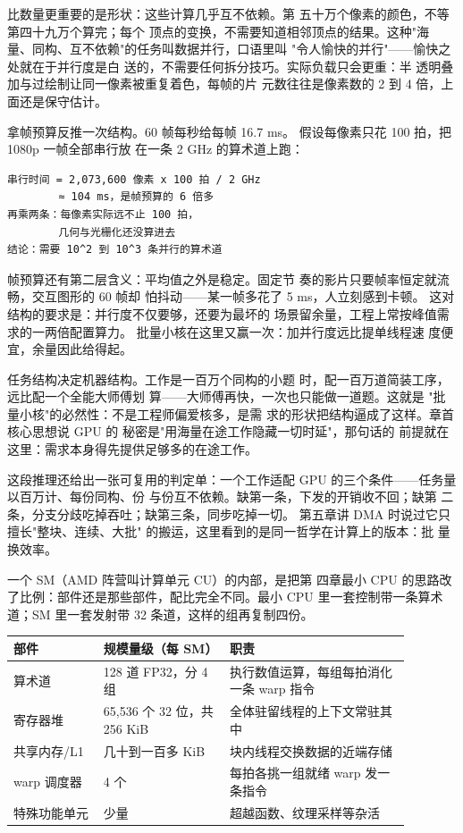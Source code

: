 比数量更重要的是形状：这些计算几乎互不依赖。第
五十万个像素的颜色，不等第四十九万个算完；每个
顶点的变换，不需要知道相邻顶点的结果。这种"海
量、同构、互不依赖"的任务叫数据并行，口语里叫
"令人愉快的并行"——愉快之处就在于并行度是白
送的，不需要任何拆分技巧。实际负载只会更重：半
透明叠加与过绘制让同一像素被重复着色，每帧的片
元数往往是像素数的 2 到 4 倍，上面还是保守估计。

拿帧预算反推一次结构。60 帧每秒给每帧 16.7 ms。
假设每像素只花 100 拍，把 1080p 一帧全部串行放
在一条 2 GHz 的算术道上跑：

\begin{lstlisting}
串行时间 = 2,073,600 像素 x 100 拍 / 2 GHz
        ≈ 104 ms，是帧预算的 6 倍多
再乘两条：每像素实际远不止 100 拍，
        几何与光栅化还没算进去
结论：需要 10^2 到 10^3 条并行的算术道
\end{lstlisting}

帧预算还有第二层含义：平均值之外是稳定。固定节
奏的影片只要帧率恒定就流畅，交互图形的 60 帧却
怕抖动——某一帧多花了 5 ms，人立刻感到卡顿。
这对结构的要求是：并行度不仅要够，还要为最坏的
场景留余量，工程上常按峰值需求的一两倍配置算力。
批量小核在这里又赢一次：加并行度远比提单线程速
度便宜，余量因此给得起。

任务结构决定机器结构。工作是一百万个同构的小题
时，配一百万道简装工序，远比配一个全能大师傅划
算——大师傅再快，一次也只能做一道题。这就是
"批量小核"的必然性：不是工程师偏爱核多，是需
求的形状把结构逼成了这样。章首核心思想说 GPU 的
秘密是"用海量在途工作隐藏一切时延"，那句话的
前提就在这里：需求本身得先提供足够多的在途工作。

这段推理还给出一张可复用的判定单：一个工作适配
GPU 的三个条件——任务量以百万计、每份同构、份
与份互不依赖。缺第一条，下发的开销收不回；缺第
二条，分支分歧吃掉吞吐；缺第三条，同步吃掉一切。
第五章讲 DMA 时说过它只擅长"整块、连续、大批"
的搬运，这里看到的是同一哲学在计算上的版本：批
量换效率。

一个 SM（AMD 阵营叫计算单元 CU）的内部，是把第
四章最小 CPU 的思路改
了比例：部件还是那些部件，配比完全不同。最小
CPU 里一套控制带一条算术道；SM 里一套发射带 32
条道，这样的组再复制四份。

\begin{longtable}{L{0.2\linewidth}L{0.28\linewidth}L{0.4\linewidth}}
\toprule
部件 & 规模量级（每 SM） & 职责 \\
\midrule
算术道 & 128 道 FP32，分 4 组 & 执行数值运算，每组每拍消化一条 warp 指令 \\
寄存器堆 & 65,536 个 32 位，共 256 KiB & 全体驻留线程的上下文常驻其中 \\
共享内存/L1 & 几十到一百多 KiB & 块内线程交换数据的近端存储 \\
warp 调度器 & 4 个 & 每拍各挑一组就绪 warp 发一条指令 \\
特殊功能单元 & 少量 & 超越函数、纹理采样等杂活 \\
\bottomrule
\end{longtable}

